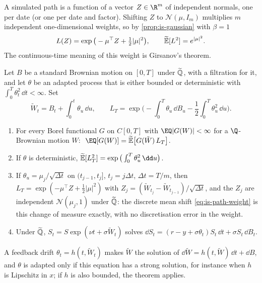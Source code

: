 A simulated path is a function of a vector $Z\in\R^m$ of independent normals, one per date
(or one per date and factor). Shifting $Z$ to $\mathcal N(\mu,I_m)$ multiplies $m$
independent one-dimensional weights, so by \cref{prop:is-gaussian} with $\beta=1$
\begin{equation}\label{eq:is-path-weight}
  L(Z)=\exp\big(-\mu^\top Z+\tfrac12|\mu|^2\big),\qquad \widetilde{\mathbb E}[L^2]=e^{|\mu|^2}.
\end{equation}
The continuous-time meaning of this weight is Girsanov's theorem.

\begin{theorem}\label{thm:is-girsanov}
Let $B$ be a standard Brownian motion on $[0,T]$ under $\widetilde{\mathbb Q}$, with a filtration for it, and let
$\theta$ be an adapted process that is either bounded or deterministic with
$\int_0^T\theta_t^2\,\dd t<\infty$. Set
\[
  \tilde W_t=B_t+\int_0^t\theta_u\,\dd u,\qquad
  L_T=\exp\Big(-\int_0^T\theta_u\,\dd B_u-\frac12\int_0^T\theta_u^2\,\dd u\Big).
\]
\begin{enumerate}[label=(\roman*)]
  \item For every Borel functional $G$ on $C[0,T]$ with $\EQ|G(W)|<\infty$ for a
    $\Q$-Brownian motion $W$: $\ \EQ[G(W)]=\Et\big[G(\tilde W)\,L_T\big]$.
  \item If $\theta$ is deterministic, $\Et[L_T^2]=\exp\big(\int_0^T\theta_u^2\,\dd u\big)$.
  \item If $\theta_u=\mu_j/\sqrt{\Delta t}$ on $(t_{j-1},t_j]$, $t_j=j\Delta t$, $\Delta t=T/m$,
    then $L_T=\exp(-\mu^\top Z+\frac12|\mu|^2)$ with
    $Z_j=(\tilde W_{t_j}-\tilde W_{t_{j-1}})/\sqrt{\Delta t}$, and the $Z_j$ are independent
    $\mathcal N(\mu_j,1)$ under $\widetilde{\mathbb Q}$: the discrete mean shift \eqref{eq:is-path-weight} is
    this change of measure exactly, with no discretisation error in the weight.
  \item Under $\widetilde{\mathbb Q}$, $S_t=S\exp(\nu t+\sigma\tilde W_t)$ solves
    $\dd S_t=(r-y+\sigma\theta_t)S_t\,\dd t+\sigma S_t\,\dd B_t$.
\end{enumerate}
\end{theorem}

A feedback drift $\theta_t=h(t,\tilde W_t)$ makes $\tilde W$ the solution of
$\dd\tilde W=h(t,\tilde W)\,\dd t+\dd B$, and $\theta$ is adapted only if this equation has a
strong solution, for instance when $h$ is Lipschitz in $x$; if $h$ is also bounded, the theorem
applies.

